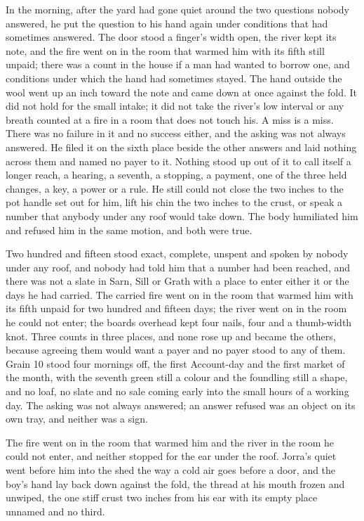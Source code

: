 In the morning, after the yard had gone quiet around the two questions nobody answered, he put the question to his hand again under conditions that had sometimes answered. The door stood a finger's width open, the river kept its note, and the fire went on in the room that warmed him with its fifth still unpaid; there was a count in the house if a man had wanted to borrow one, and conditions under which the hand had sometimes stayed. The hand outside the wool went up an inch toward the note and came down at once against the fold. It did not hold for the small intake; it did not take the river's low interval or any breath counted at a fire in a room that does not touch his. A miss is a miss. There was no failure in it and no success either, and the asking was not always answered. He filed it on the sixth place beside the other answers and laid nothing across them and named no payer to it. Nothing stood up out of it to call itself a longer reach, a hearing, a seventh, a stopping, a payment, one of the three held changes, a key, a power or a rule. He still could not close the two inches to the pot handle set out for him, lift his chin the two inches to the crust, or speak a number that anybody under any roof would take down. The body humiliated him and refused him in the same motion, and both were true.

Two hundred and fifteen stood exact, complete, unspent and spoken by nobody under any roof, and nobody had told him that a number had been reached, and there was not a slate in Sarn, Sill or Grath with a place to enter either it or the days he had carried. The carried fire went on in the room that warmed him with its fifth unpaid for two hundred and fifteen days; the river went on in the room he could not enter; the boards overhead kept four nails, four and a thumb-width knot. Three counts in three places, and none rose up and became the others, because agreeing them would want a payer and no payer stood to any of them. Grain 10 stood four mornings off, the first Account-day and the first market of the month, with the seventh green still a colour and the foundling still a shape, and no loaf, no slate and no sale coming early into the small hours of a working day. The asking was not always answered; an answer refused was an object on its own tray, and neither was a sign.

The fire went on in the room that warmed him and the river in the room he could not enter, and neither stopped for the ear under the roof. Jorra's quiet went before him into the shed the way a cold air goes before a door, and the boy's hand lay back down against the fold, the thread at his mouth frozen and unwiped, the one stiff crust two inches from his ear with its empty place unnamed and no third.
